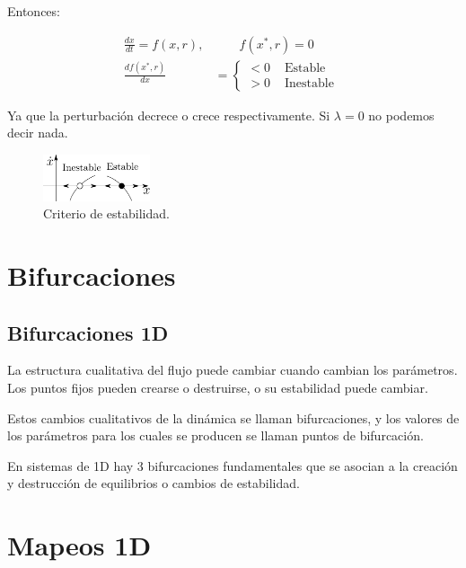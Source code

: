\documentclass[%
 reprint,
 amsmath,amssymb,
 aps,
]{revtex4-1}
\begin{document}
Entonces:

$$
\begin{aligned}
\frac{d x}{d t}=f(x, r), & \qquad f\left(x^{*}, r\right)=0 \\
\frac{d f\left(x^{*}, r\right)}{d x} &=\left\{\begin{array}{ll}
<0 & \text { Estable } \\
>0 & \text { Inestable }
\end{array}\right.
\end{aligned}
$$

Ya que la perturbación decrece o crece respectivamente. Si $\lambda=0$ no podemos decir nada.



\begin{figure}[ht!]
  \includegraphics[width = 0.28\textwidth]{estable-Inestable.pdf}
  \caption{\label{fig:figura1} Criterio de estabilidad.}
\end{figure}

\section{Bifurcaciones}

\subsection{Bifurcaciones 1D}

La estructura cualitativa del flujo puede cambiar cuando cambian los parámetros. Los puntos fijos pueden crearse o destruirse, o su estabilidad puede cambiar.

Estos cambios cualitativos de la dinámica se llaman bifurcaciones, y los valores de los parámetros para los cuales se producen se llaman puntos de bifurcación. 

En sistemas de 1D hay 3 bifurcaciones fundamentales que se asocian a la creación y destrucción de equilibrios o cambios de estabilidad.






\section{Mapeos 1D}
\end{document}
